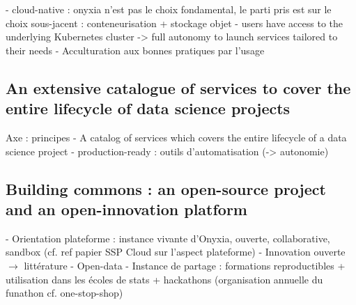 - cloud-native : onyxia n'est pas le choix fondamental, le parti pris est sur le choix sous-jacent : conteneurisation + stockage objet
- users have access to the underlying Kubernetes cluster -> full autonomy to launch services tailored to their needs
- Acculturation aux bonnes pratiques par l'usage

\label{ssec:catalog}
\subsection{An extensive catalogue of services to cover the entire lifecycle of data science projects}

Axe : principes
- A catalog of services which covers the entire lifecycle of a data science project
- production-ready : outils d'automatisation (-> autonomie)

\subsection{Building commons : an open-source project and an open-innovation platform}

- Orientation plateforme : instance vivante d'Onyxia, ouverte, collaborative, sandbox (cf. ref papier SSP Cloud sur l'aspect plateforme)
- Innovation ouverte $\rightarrow$ littérature
- Open-data
- Instance de partage : formations reproductibles + utilisation dans les écoles de stats + hackathons (organisation annuelle du funathon cf. one-stop-shop)
